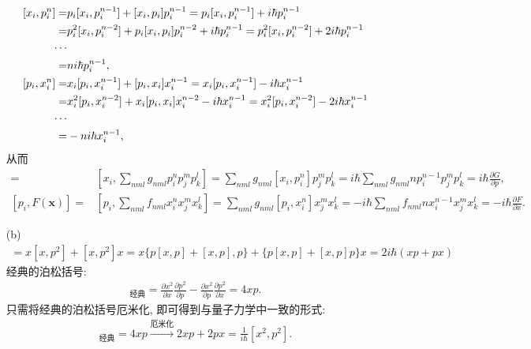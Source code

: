 \documentclass{assignment}
\begin{document}
\begin{sol}
\begin{itemize}
\begin{align}
            \notag[x_i,p_i^n]=&p_i[x_i,p_i^{n-1}]+[x_i,p_i]p_i^{n-1}=p_i[x_i,p_i^{n-1}]+i\hbar p_i^{n-1}\\
            \notag=&p_i^2[x_i,p_i^{n-2}]+p_i[x_i,p_i]p_i^{n-2}+i\hbar p_i^{n-1}=p_i^2[x_i,p_i^{n-2}]+2i\hbar p_i^{n-1}\\
            \notag\cdots&\\
            =&ni\hbar p_i^{n-1},\\
            \notag[p_i,x_i^n]=&x_i[p_i,x_i^{n-1}]+[p_i,x_i]x_i^{n-1}=x_i[p_i,x_i^{n-1}]-i\hbar x_i^{n-1}\\
            \notag=&x_i^2[p_i,x_i^{n-2}]+x_i[p_i,x_i]x_i^{n-2}-i\hbar x_i^{n-1}=x_i^2[p_i,x_i^{n-2}]-2i\hbar x_i^{n-1}\\
            \notag\cdots&\\
            =&-ni\hbar x_i^{n-1},
        \end{align}
        从而
        \begin{align}
            [x_i,G(\bm{p})]=&[x_i,\sum_{nml}g_{nml}p_i^np_j^mp_k^l]=\sum_{nml}g_{nml}[x_i,p_i^n]p_j^mp_k^l=i\hbar\sum_{nml}g_{nml}np_i^{n-1}p_j^mp_k^l=i\hbar\frac{\partial G}{\partial p},\\
            [p_i,F(\bm{x})]=&[p_i,\sum_{nml}f_{nml}x_i^nx_j^mx_k^l]=\sum_{nml}g_{nml}[p_i,x_i^n]x_j^mx_k^l=-i\hbar\sum_{nml}f_{nml}nx_i^{n-1}x_j^mx_k^l=-i\hbar\frac{\partial F}{\partial x}.
        \end{align}
        \item[(b)] 
        \begin{align}
            [x^2,p^2]=x[x,p^2]+[x,p^2]x=x\{p[x,p]+[x,p],p\}+\{p[x,p]+[x,p]p\}x=2i\hbar(xp+px)
        \end{align}
        经典的泊松括号:
        \begin{align}
            [x^2,p^2]_{\text{经典}}=\frac{\partial x^2}{\partial x}\frac{\partial p^2}{\partial p}-\frac{\partial x^2}{\partial p}\frac{\partial p^2}{\partial x}=4xp.
        \end{align}
        只需将经典的泊松括号厄米化, 即可得到与量子力学中一致的形式:
        \begin{align}
            [x^2,p^2]_{\text{经典}}=4xp\overset{\text{厄米化}}{\longrightarrow}2xp+2px=\frac{1}{i\hbar}[x^2,p^2].
        \end{align}
    \end{itemize}
\end{sol}
\end{document}
